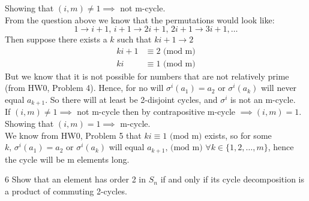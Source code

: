 \documentclass[12pt]{article}
\begin{document}
\begin{solution}
    \bbni
    \bbni    
    Showing that $(i, m) \neq 1 \implies$ not m-cycle. \\
    From the question above we know that the permutations would look like: 
    \[1 \to i+1,  \, i+ 1 \to 2i + 1, \, 2i +1 \to 3i + 1, \ldots\]
    Then suppose there exists a $k$ such that $ki + 1 \to 2$
    \begin{align*}
        ki + 1 &\equiv 2 \text{ (mod m)} \\
        ki &\equiv 1 \text{ (mod m)}
    \end{align*}
    But we know that it is not possible for numbers that are not relatively prime (from HW0, Problem 4). Hence, for no will $\sigma^i(a_1) = a_2$ or $\sigma^i(a_k)$ will never equal $a_{k+1}$. So there will at least be 2-disjoint cycles, and $\sigma^i$ is not an m-cycle. \\

    If $(i, m) \neq 1 \implies$ not m-cycle then by contrapositive m-cycle $\implies (i, m) = 1.$
    \\

    Showing that $(i, m) = 1 \implies$ m-cycle. \\

    We know from HW0, Problem 5 that $ki \equiv 1 \text{ (mod m)}$ exists, so for some $k, \, \sigma^i(a_1) = a_2$ or $\sigma^i(a_k)$ will equal $a_{k+1}, \, \text{(mod m) } \forall k \in \{ 1, 2, \ldots, m\} $, hence the cycle will be m elements long. 
 \end{solution}

 \newpage

\begin{problem}{6}
    Show that an element has order 2 in $S_n$ if and only if its cycle decomposition is a product of commuting 2-cycles. 
\end{problem}
\end{document}

